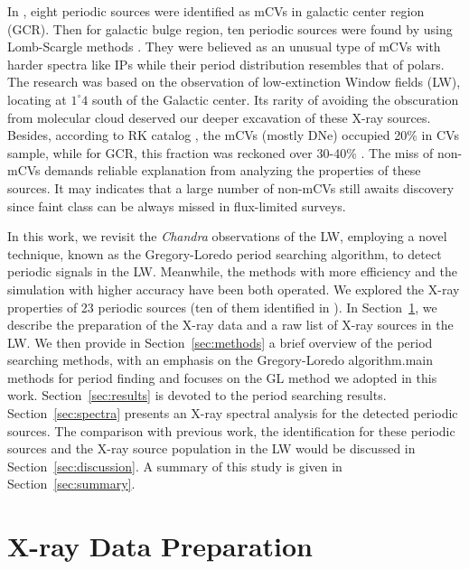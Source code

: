 \documentclass[fleqn,usenatbib]{mnras}
\begin{document}
In \citet{2003ApJ...599..465M}, eight periodic sources were identified as mCVs in galactic center region (GCR). Then for galactic bulge region, ten periodic sources were found by using Lomb-Scargle methods \citep{2012ApJ...746..165H}. They were believed as an unusual type of mCVs with harder spectra like IPs while their period distribution resembles that of polars. The research was based on the observation of low-extinction Window fields (LW), locating at $1^{\circ}4$ south of the Galactic center. Its rarity of avoiding the obscuration from molecular cloud deserved our deeper excavation of these X-ray sources. 
Besides, according to RK catalog \citep{2003A&A...404..301R}, the mCVs (mostly DNe) occupied 20\% in CVs sample, while for GCR, this fraction was reckoned over 30-40\% \citep{2016ApJ...826..160H,2012ApJ...746..165H}. The miss of non-mCVs demands reliable explanation from analyzing the properties of these sources. It may indicates that a large number of non-mCVs still awaits discovery since faint class can be always missed in flux-limited surveys.

In this work, we revisit the {\it Chandra} observations of the LW, employing a novel technique, known as the Gregory-Loredo period searching algorithm, to detect periodic signals in the LW. Meanwhile, the methods with more efficiency and the simulation with higher accuracy have been both operated. 
We explored the X-ray properties of 23 periodic sources (ten of them identified in \cite{2012ApJ...746..165H}). 
In Section~\ref{sec:obs}, we describe the preparation of the X-ray data and a raw list of X-ray sources in the LW.
We then provide in Section~\ref{sec:methods} a brief overview of the period searching methods, with an emphasis on the Gregory-Loredo algorithm.main methods for period finding and focuses on the GL method we adopted in this work. 
Section~\ref{sec:results} is devoted to the period searching results.
Section~\ref{sec:spectra} presents an X-ray spectral analysis for the detected periodic sources. 
The comparison with previous work, the identification for these periodic sources and the X-ray source population in the LW would be discussed in Section~\ref{sec:discussion}.
A summary of this study is given in Section~\ref{sec:summary}.

\section{X-ray Data Preparation} \label{sec:obs}
\end{document}
